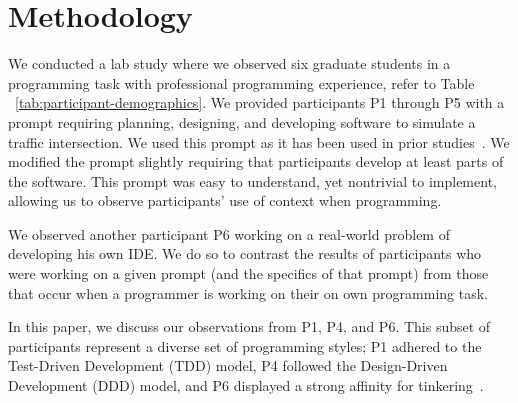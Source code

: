 
\section{Methodology}\label{sec:methodology}


We conducted a lab study where we observed six graduate students in a programming task with professional programming experience, refer to Table ~\ref{tab:participant-demographics}.
We provided participants P1 through P5 with a prompt requiring planning, designing, and developing software to simulate a traffic intersection. We used this prompt as it has been used in prior studies~\cite{Mangano:2012}. We modified the prompt slightly requiring that participants develop at least parts of the software. This prompt was easy to understand, yet nontrivial to implement, allowing us to observe participants' use of context when programming.

We observed another participant P6 working on a real-world problem of developing his own IDE. We do so to contrast the results of participants who were working on a given prompt (and the specifics of that prompt) from those that occur when a programmer is working on their on own programming task.




In this paper, we discuss our observations from P1, P4, and P6. This subset of participants represent a diverse set of programming styles; P1 adhered to the Test-Driven Development (TDD) model, P4 followed the Design-Driven Development (DDD) model, and P6 displayed a strong affinity for tinkering~\cite{Beckwith:2006}. %


